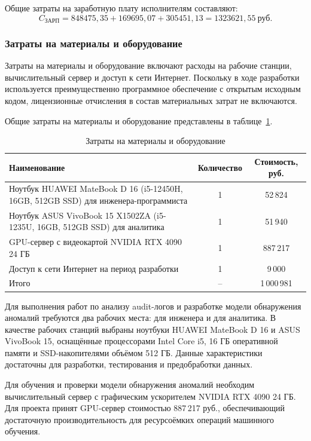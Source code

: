 Общие затраты на заработную плату исполнителям составляют:
$$
C_{\text{ЗАРП}} = 848475{,}35 + 169695{,}07 + 305451{,}13 = 1323621{,}55 \ \text{руб.}
$$

\subsubsection{Затраты на материалы и оборудование}

Затраты на материалы и оборудование включают расходы на рабочие станции, вычислительный сервер и доступ к сети Интернет. Поскольку в ходе разработки используется преимущественно программное обеспечение с открытым исходным кодом, лицензионные отчисления в состав материальных затрат не включаются.

Общие затраты на материалы и оборудование представлены в таблице~\ref{tab:materials_costs}.

\begin{table}[h!]
    \centering
    \caption{Затраты на материалы и оборудование}
    \label{tab:materials_costs}
    \begin{tabular}{|p{5.8cm}|c|c|}
        \hline
        Наименование & Количество & Стоимость, руб. \\
        \hline
        Ноутбук HUAWEI MateBook D 16 (i5-12450H, 16GB, 512GB SSD) для инженера-программиста & 1 & 52\,824 \\
        \hline
        Ноутбук ASUS VivoBook 15 X1502ZA (i5-1235U, 16GB, 512GB SSD) для аналитика & 1 & 51\,940 \\
        \hline
        GPU-сервер с видеокартой NVIDIA RTX 4090 24 ГБ & 1 & 887\,217 \\
        \hline
        Доступ к сети Интернет на период разработки & 1 & 9\,000 \\
        \hline
        Итого & -- & 1\,000\,981 \\
        \hline
    \end{tabular}
\end{table}

Для выполнения работ по анализу audit-логов и разработке модели обнаружения аномалий требуются два рабочих места: для инженера и для аналитика. В качестве рабочих станций выбраны ноутбуки HUAWEI MateBook D 16 и ASUS VivoBook 15, оснащённые процессорами Intel Core i5, 16 ГБ оперативной памяти и SSD-накопителями объёмом 512 ГБ. Данные характеристики достаточны для разработки, тестирования и предобработки данных.

Для обучения и проверки модели обнаружения аномалий необходим вычислительный сервер с графическим ускорителем NVIDIA RTX 4090 24 ГБ. Для проекта принят GPU-сервер стоимостью 887\,217 руб., обеспечивающий достаточную производительность для ресурсоёмких операций машинного обучения.


